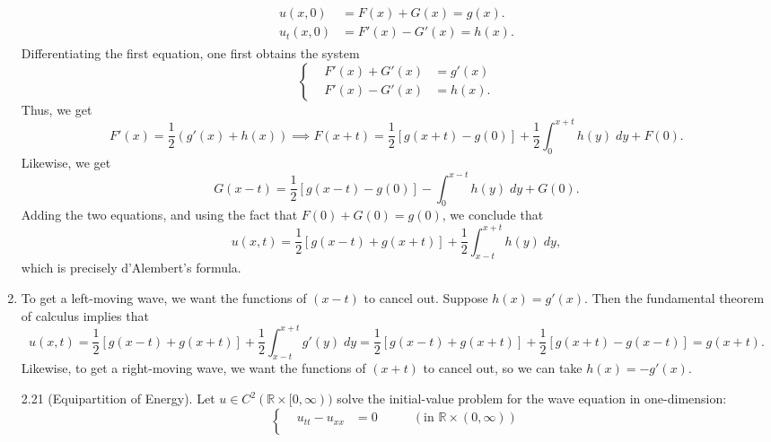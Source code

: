 \documentclass{article}
\begin{document}
\begin{enumerate}[itemsep =-2pt,label = (\alph{*})]
\begin{align*}
	\begin{split}
		u(x, 0) &= F(x) + G(x) = g(x). \\
		u_{t}(x, 0) &= F'(x) - G'(x) = h(x). 
	\end{split}
\end{align*}
Differentiating the first equation, one first obtains the system 
\begin{equation*}
	\left\{
	\begin{alignedat}{2}
		&F'(x) + G'(x) &= g'(x) \\
		&F'(x) - G'(x) &= h(x). 
	\end{alignedat}
	\right. 
\end{equation*} 
Thus, we get 
\begin{equation*}
	F'(x) = \frac{1}{2}(g'(x) +h(x)) \implies F(x + t) = \frac{1}{2}[g(x+ t) - g(0)] + \frac{1}{2}\int_{0}^{x + t}h(y)\;dy + F(0). 
\end{equation*}
Likewise, we get 
\begin{equation*}
	G(x-t) = \frac{1}{2}[g(x - t) - g(0)] -\int_{0}^{x - t}h(y)\;dy + G(0). 
\end{equation*}
Adding the two equations, and using the fact that $F(0) + G(0) = g(0)$, we conclude that 
\begin{equation*}
	u(x,t) = \frac{1}{2}[g(x - t) + g(x + t)] + \frac{1}{2}\int_{x - t}^{x + t}h(y)\;dy, 
\end{equation*}
which is precisely d'Alembert's formula. 
\item To get a left-moving wave, we want the functions of $(x - t)$ to cancel out. Suppose $h(x) = g'(x)$. Then the fundamental theorem of calculus implies that 
\begin{equation*}
	u(x, t) = \frac{1}{2}[g(x - t) + g(x + t)] + \frac{1}{2}\int_{x - t}^{x + t}g'(y)\;dy = \frac{1}{2}[g(x - t) + g(x + t)] +\frac{1}{2}[g(x + t) - g(x - t)] = g(x + t). 
\end{equation*}
Likewise, to get a right-moving wave, we want the functions of $(x + t)$ to cancel out, so we can take $h(x) = -g'(x)$. 
\begin{prb}{2.21}
	(Equipartition of Energy). Let $u \in C^{2}(\mathbb{R} \times [0,\infty))$ solve the initial-value problem for the wave equation in one-dimension: 
	\begin{equation*}
		\left\{
		\begin{alignedat}{3}
			&u_{tt} - u_{xx} &=0 \qquad &(\text{in } \mathbb{R} \times (0,\infty)) \\

\end{alignedat}
\end{equation*}
\end{prb}
\end{enumerate}
\end{document}
